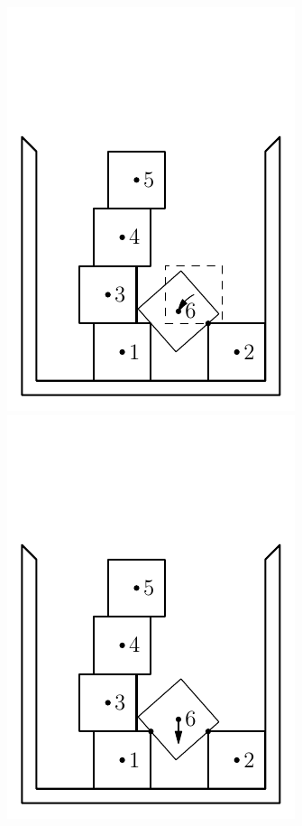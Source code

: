 \documentclass[12pt, sumlimits, intlimits]{article}
\begin{document}
\begin{figure}
\includegraphics[width=\w]{btr-9}%
\includegraphics[width=\w]{btr-10}%

\end{figure}
\end{document}
